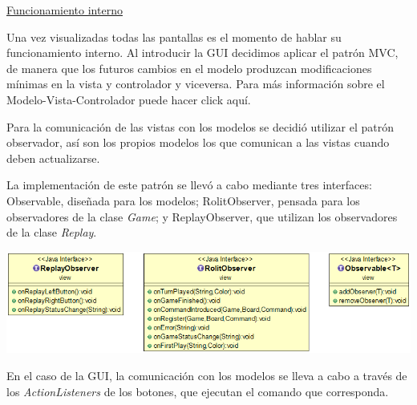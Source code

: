 \documentclass[../DocumentoOficial.tex]{subfiles}
\begin{document}
\begin{sprint}[4]
\underline{Funcionamiento interno}

Una vez visualizadas todas las pantallas es el momento de hablar su funcionamiento interno. Al introducir la GUI decidimos aplicar el patrón MVC, de manera que los futuros cambios en el modelo produzcan modificaciones mínimas en la vista y controlador y viceversa. Para más información sobre el Modelo-Vista-Controlador puede hacer click aquí. %

Para la comunicación de las vistas con los modelos se decidió utilizar el patrón observador, así son los propios modelos los que comunican a las vistas cuando deben actualizarse.

La implementación de este patrón se llevó a cabo mediante tres interfaces: Observable, diseñada para los modelos; RolitObserver, pensada para los observadores de la clase \textit{Game}; y ReplayObserver, que utilizan los observadores de la clase \textit{Replay}.

\begin{center}
\includegraphics[scale=0.43]{observadores-sprint4.png}
\end{center}

En el caso de la GUI, la comunicación con los modelos se lleva a cabo a través de los \textit{ActionListeners} de los botones, que ejecutan el comando que corresponda.

\end{sprint}
\end{document}
